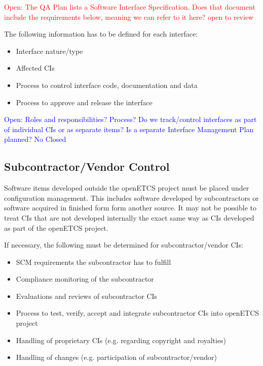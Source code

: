 \documentclass{template/openetcs_report}
\begin{document}
\textcolor{red}{Open: The QA Plan lists a Software Interface Specification. Does that document include the requirements below, meaning we can refer to it here? open to review}

The following information has to be defined for each interface:

\vspace{-10pt}
\begin{itemize}
\item Interface nature/type
\item Affected CIs
\item Process to control interface code, documentation and data
\item Process to approve and release the interface
\end{itemize}

\textcolor{blue}{Open: Roles and responsibilities? Process? Do we track/control interfaces as part of individual CIs or as separate items? Is a separate Interface Management Plan planned? No Closed}


\subsection{Subcontractor/Vendor Control} %
\label{sec:Subcontractor/Vendor Control}

Software items developed outside the openETCS project must be placed under configuration management. This includes software developed by subcontractors or software acquired in finished form form another source. It may not be possible to treat CIs that are not developed internally the exact same way as CIs developed as part of the openETCS project.

If necessary, the following must be determined for subcontractor/vendor CIs:

\vspace{-10pt}
\begin{itemize}
\item SCM requirements the subcontractor has to fulfill
\item Compliance monitoring of the subcontractor
\item Evaluations and reviews of subcontractor CIs
\item Process to test, verify, accept and integrate subcontractor CIs into openETCS project
\item Handling of proprietary CIs (e.g. regarding copyright and royalties)
\item Handling of changes (e.g. participation of subcontractor/vendor)
\end{itemize}
\end{document}
